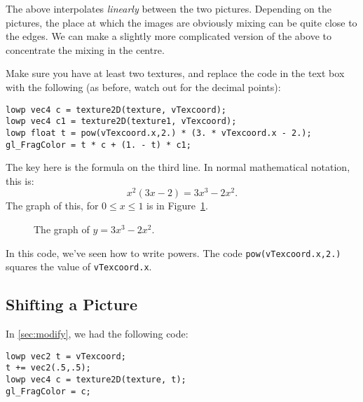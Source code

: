 \documentclass[
  html5,%
  mathml,%
  use filename%
]{internet}
\let\origtikzsetnextfilename\tikzsetnextfilename
\def\tikzsetnextfilename#1{%
  \origtikzsetnextfilename{#1}
  \mysetlabel{#1}
}
\newcommand{\mysetlabel}[1]{%
  \gdef\mynextlabel{#1}}
\newcommand{\autolabel}{%
  \label{fig:\mynextlabel}
  \global\let\mynextlabel\relax
}
\begin{document}
The above interpolates \emph{linearly} between the two pictures.
Depending on the pictures, the place at which the images are obviously mixing can be quite close to the edges.
We can make a slightly more complicated version of the above to concentrate the mixing in the centre.

Make sure you have at least two textures, and replace the code in the text box with the following (as before, watch out for the decimal points):

\begin{tcolorbox}
\begin{verbatim}
lowp vec4 c = texture2D(texture, vTexcoord);
lowp vec4 c1 = texture2D(texture1, vTexcoord);
lowp float t = pow(vTexcoord.x,2.) * (3. * vTexcoord.x - 2.);
gl_FragColor = t * c + (1. - t) * c1;
\end{verbatim}
\end{tcolorbox}

The key here is the formula on the third line.
In normal mathematical notation, this is:
%
\[
  x^2 (3 x - 2) = 3 x^3 - 2 x^2.
  \]
%
The graph of this, for \(0 \le x \le 1\) is in Figure~\ref{fig:smoothstep}.

\begin{figure}
\centering
{}
\caption{The graph of \(y = 3 x^3 - 2 x^2\).}
\autolabel
\end{figure}

In this code, we've seen how to write powers.
The code \verb!pow(vTexcoord.x,2.)! squares the value of \verb!vTexcoord.x!.

\subsection{Shifting a Picture}

In \ref{sec:modify}, we had the following code:

\begin{tcolorbox}
\begin{verbatim}
lowp vec2 t = vTexcoord;
t += vec2(.5,.5);
lowp vec4 c = texture2D(texture, t);
gl_FragColor = c;
\end{verbatim}
\end{tcolorbox}
\end{document}
